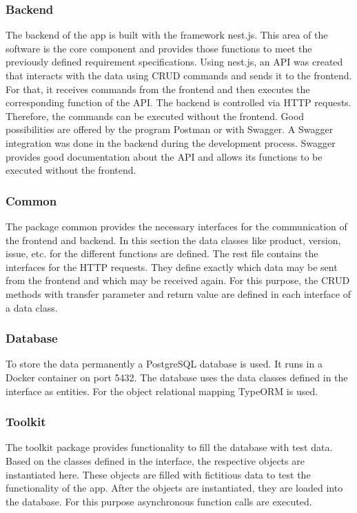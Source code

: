     \subsubsection*{Backend}
    The backend of the app is built with the framework nest.js. This area of the software is the core component and provides those functions to meet the previously defined requirement specifications. Using nest.js, an API was created that interacts with the data using CRUD commands and sends it to the frontend. For that, it receives commands from the frontend and then executes the corresponding function of the API. The backend is controlled via HTTP requests. Therefore, the commands can be executed without the frontend. Good possibilities are offered by the program Postman or with Swagger. A Swagger integration was done in the backend during the development process. Swagger provides good documentation about the API and allows its functions to be executed without the frontend.

    \subsubsection*{Common}
    The package common provides the necessary interfaces for the communication of the frontend and backend. In this section the data classes like product, version, issue, etc. for the different functions are defined. 
    The rest file contains the interfaces for the HTTP requests. They define exactly which data may be sent from the frontend and which may be received again. For this purpose, the CRUD methods with transfer parameter and return value are defined in each interface of a data class.
    
    \subsubsection*{Database}
    To store the data permanently a PostgreSQL database is used. It runs in a Docker container on port 5432. The database uses the data classes defined in the interface as entities. For the object relational mapping TypeORM is used. 
    
    \subsubsection*{Toolkit}
    The toolkit package provides functionality to fill the database with test data. Based on the classes defined in the interface, the respective objects are instantiated here. These objects are filled with fictitious data to test the functionality of the app. After the objects are instantiated, they are loaded into the database. For this purpose asynchronous function calls are executed.
    

